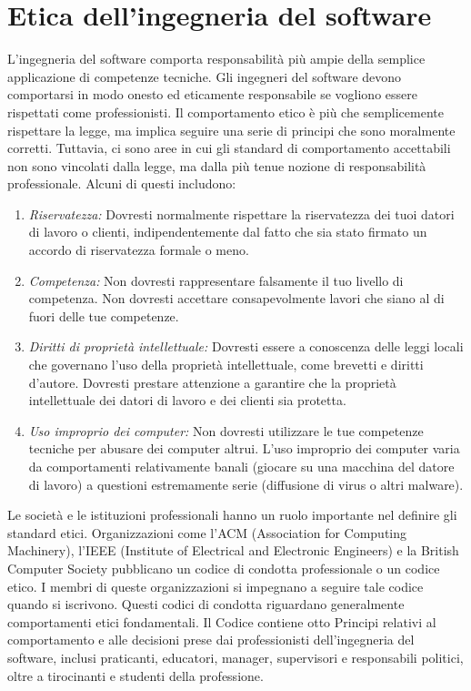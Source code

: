 \section{Etica dell'ingegneria del software}
L'ingegneria del software comporta responsabilità più ampie della semplice applicazione di competenze tecniche. Gli ingegneri del software devono comportarsi in modo onesto ed eticamente responsabile se vogliono essere rispettati come professionisti. Il comportamento etico è più che semplicemente rispettare la legge, ma implica seguire una serie di principi che sono moralmente corretti. Tuttavia, ci sono aree in cui gli standard di comportamento accettabili non sono vincolati dalla legge, ma dalla più tenue nozione di responsabilità professionale. Alcuni di questi includono:
\begin{enumerate}
    \item \textit{Riservatezza:} Dovresti normalmente rispettare la riservatezza dei tuoi datori di lavoro o clienti, indipendentemente dal fatto che sia stato firmato un accordo di riservatezza formale o meno.
    \item \textit{Competenza:} Non dovresti rappresentare falsamente il tuo livello di competenza. Non dovresti accettare consapevolmente lavori che siano al di fuori delle tue competenze.
    \item \textit{Diritti di proprietà intellettuale:} Dovresti essere a conoscenza delle leggi locali che governano l'uso della proprietà intellettuale, come brevetti e diritti d'autore. Dovresti prestare attenzione a garantire che la proprietà intellettuale dei datori di lavoro e dei clienti sia protetta.
    \item \textit{Uso improprio dei computer:} Non dovresti utilizzare le tue competenze tecniche per abusare dei computer altrui. L'uso improprio dei computer varia da comportamenti relativamente banali (giocare su una macchina del datore di lavoro) a questioni estremamente serie (diffusione di virus o altri malware).
\end{enumerate}
Le società e le istituzioni professionali hanno un ruolo importante nel definire gli standard etici. Organizzazioni come l'ACM (Association for Computing Machinery), l'IEEE (Institute of Electrical and Electronic Engineers) e la British Computer Society pubblicano un codice di condotta professionale o un codice etico. I membri di queste organizzazioni si impegnano a seguire tale codice quando si iscrivono. Questi codici di condotta riguardano generalmente comportamenti etici fondamentali. Il Codice contiene otto Principi relativi al comportamento e alle decisioni prese dai professionisti dell'ingegneria del software, inclusi praticanti, educatori, manager, supervisori e responsabili politici, oltre a tirocinanti e studenti della professione.

